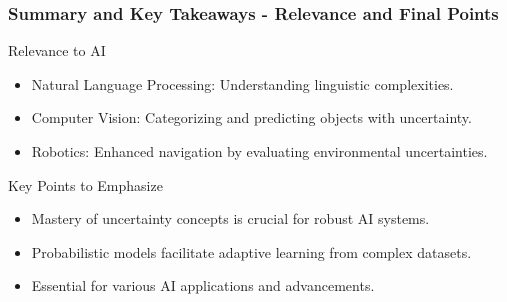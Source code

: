 \documentclass[aspectratio=169]{beamer}
\begin{document}
\begin{frame}[fragile]
    \frametitle{Summary and Key Takeaways - Relevance and Final Points}
    \begin{block}{Relevance to AI}
        \begin{itemize}
            \item Natural Language Processing: Understanding linguistic complexities.
            \item Computer Vision: Categorizing and predicting objects with uncertainty.
            \item Robotics: Enhanced navigation by evaluating environmental uncertainties.
        \end{itemize}
    \end{block}
    \begin{block}{Key Points to Emphasize}
        \begin{itemize}
            \item Mastery of uncertainty concepts is crucial for robust AI systems.
            \item Probabilistic models facilitate adaptive learning from complex datasets.
            \item Essential for various AI applications and advancements.
        \end{itemize}
    \end{block}
\end{frame}
\end{document}
